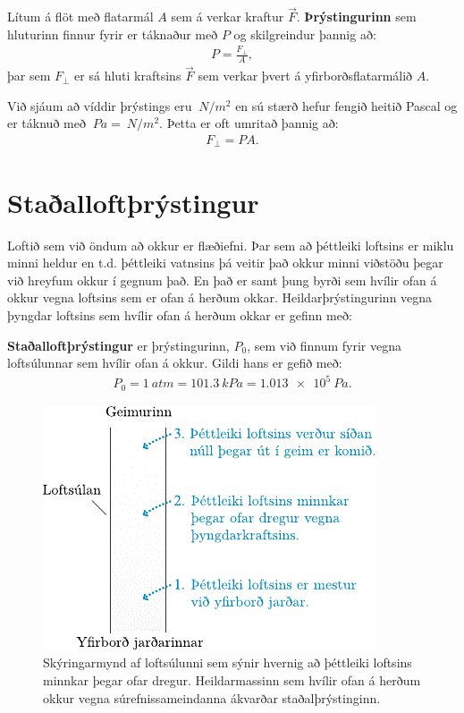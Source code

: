 \ifdefined \wholebook \else\documentclass[oneside]{book}\usepackage{EdlBook}\graphicspath{{figures/}}
\begin{document}
\begin{tcolorbox}
\begin{definition}
Lítum á flöt með flatarmál $A$ sem á verkar kraftur $\Vec{F}$. \textbf{Þrýstingurinn} sem hluturinn finnur fyrir er táknaður með $P$ og skilgreindur þannig að: 
\begin{align*}
    P = \frac{F_\perp}{A},
\end{align*}
þar sem $F_\perp$ er sá hluti kraftsins $\Vec{F}$ sem verkar þvert á yfirborðsflatarmálið $A$.
\end{definition}
\end{tcolorbox}
Við sjáum að víddir þrýstings eru $\SI{}{N/m^2}$ en sú stærð hefur fengið heitið Pascal og er táknuð með $\SI{}{Pa} = \SI{}{N/m^2}$. Þetta er oft umritað þannig að:
\begin{align*}
    F_\perp = P A.
\end{align*}

\section{Staðalloftþrýstingur}

Loftið sem við öndum að okkur er flæðiefni. Þar sem að þéttleiki loftsins er miklu minni heldur en t.d. þéttleiki vatnsins þá veitir það okkur minni viðstöðu þegar við hreyfum okkur í gegnum það. En það er samt þung byrði sem hvílir ofan á okkur vegna loftsins sem er ofan á herðum okkar. Heildarþrýstingurinn vegna þyngdar loftsins sem hvílir ofan á herðum okkar er gefinn með:


\begin{tcolorbox}
\begin{definition}
\textbf{Staðalloftþrýstingur} er þrýstingurinn, $P_0$, sem við finnum fyrir vegna loftsúlunnar sem hvílir ofan á okkur. Gildi hans er gefið með:
\begin{align*}
    P_0 = \SI{1}{atm} = \SI{101.3}{kPa} = \SI{1.013e5}{Pa}.
\end{align*}
\end{definition}
\end{tcolorbox}


\begin{figure}[H]
    \centering
    \includegraphics{figures/loftsulan.pdf}
    \caption{Skýringarmynd af loftsúlunni sem sýnir hvernig að þéttleiki loftsins minnkar þegar ofar dregur. Heildarmassinn sem hvílir ofan á herðum okkur vegna súrefnissameindanna ákvarðar staðalþrýstinginn.}
    \label{fig:loftsula}
\end{figure}
\end{document}
